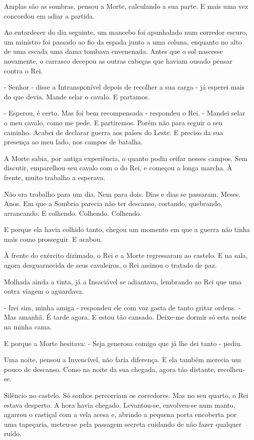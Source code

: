 Amplas são as sombras, pensou a Morte, calculando a sua parte. E mais uma vez concordou em adiar a partida.

Ao entardecer do dia seguinte, um mancebo foi apunhalado num corredor escuro, um ministro foi passado ao fio da espada junto a uma coluna, enquanto no alto de uma escada uma dama tombava envenenada. Antes que o sol nascesse novamente, o carrasco decepou as outras cabeças que haviam ousado pensar contra o Rei.

- Senhor - disse a Intransponível depois de recolher a sua carga - já esperei mais do que devia. Mande selar o cavalo. E partamos.

- Esperou, é certo. Mas foi bem recompensada - respondeu o Rei. - Mandei selar o meu cavalo, como me pede. E partiremos. Porém não para seguir o seu caminho. Acabei de declarar guerra aos países do Leste. E preciso da sua presença ao meu lado, nos campos de batalha.

A Morte sabia, por antiga experiência, o quanto podia ceifar nesses campos. Sem discutir, emparelhou seu cavalo com o do Rei, e começou a longa marcha. À frente, muito trabalho a esperava.

Não era trabalho para um dia. Nem para dois. Dias e dias se passaram. Meses. Anos. Em que a Sombria parecia não ter descanso, cortando, quebrando, arrancando. E colhendo. Colhendo. Colhendo.

E porque ela havia colhido tanto, chegou um momento em que a guerra não tinha mais como prosseguir. E acabou.

À frente do exército dizimado, o Rei e a Morte regressaram ao castelo. E na sala, agora desguarnecida de seus cavaleiros, o Rei assinou o tratado de paz.

Molhada ainda a tinta, já a Insaciável se adiantava, lembrando ao Rei que uma outra viagem o aguardava.

- Irei sim, minha amiga - respondeu ele com voz gasta de tanto gritar ordens. - Mas amanhã. É tarde agora. E estou tão cansado. Deixe-me dormir só esta noite na minha cama.

E porque a Morte hesitava: - Seja generosa comigo que já lhe dei tanto - pediu.

Uma noite, pensou a Invencível, não faria diferença. E ela também merecia um pouco de descanso. Como na noite da sua chegada, agora tão distante, recolheu-se.

Silêncio no castelo. Só sonhos percorriam os corredores. Mas no seu quarto, o Rei estava desperto. A hora havia chegado. Levantou-se, envolveu-se num manto, agarrou o castiçal com a vela acesa e, abrindo a pequena porta encoberta por uma tapeçaria, meteu-se pela passagem secreta cuidando de não fazer qualquer ruído.

